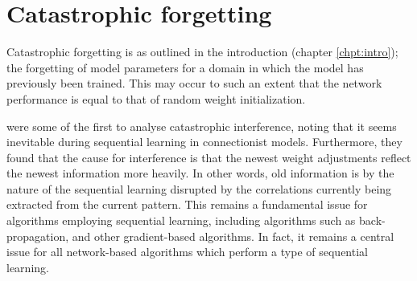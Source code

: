 \section{Catastrophic forgetting}\label{chpt:catastrophic-forgetting}

Catastrophic forgetting \citep{McCloskey1989, Ratcliff1990} is as outlined in the introduction (chapter \ref{chpt:intro}); the forgetting of model parameters for a domain in which the model has previously been trained. This may occur to such an extent that the network performance is equal to that of random weight initialization.

\cite{McCloskey1989} were some of the first to analyse catastrophic interference, noting that it seems inevitable during sequential learning in connectionist models. Furthermore, they found that the cause for interference is that the newest weight adjustments reflect the newest information more heavily. In other words, old information is by the nature of the sequential learning disrupted by the correlations currently being extracted from the current pattern. This remains a fundamental issue for algorithms employing sequential learning, including algorithms such as back-propagation, and other gradient-based algorithms. In fact, it remains a central issue for all network-based algorithms which perform a type of sequential learning.

